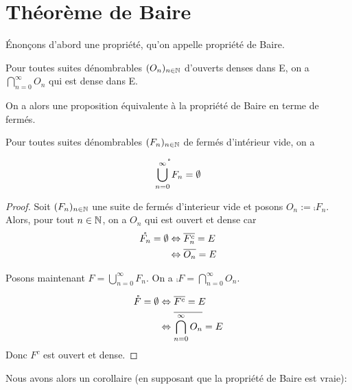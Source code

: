 \chapter{Théorème de Baire}
\label{chapter_baire_theorem}

Énonçons d'abord une propriété, qu'on appelle propriété de Baire.

\begin{propriete} 
	\label{property_baire_open}
	Pour toutes suites dénombrables $(O_{n})_{n \in \mathbb{N}}$ d'ouverts denses dans E, on a $\displaystyle
	\bigcap_{n = 0}^{\infty} O_{n}$ qui est dense dans E.
\end{propriete}

On a alors une proposition équivalente à la propriété de Baire en terme de
fermés.

\begin{propriete} 
\label{property_baire_closed}
Pour toutes suites dénombrables $(F_{n})_{n \in \mathbb{N}}$ de fermés d'intérieur vide, on a
	
	\begin{equation}
		\mathring{\bigcup_{n = 0}^{\infty} F_{n}} = \emptyset
	\end{equation}
\end{propriete}

\ifdefined\outputproof
\begin{proof}
	Soit $(F_{n})_{n \in \mathbb{N}}$ une suite de fermés d'interieur vide et
	posons $O_{n} := \comp{F_{n}}$. Alors, pour tout $n \in \mathbb{N}$, on a
	$O_{n}$ qui est ouvert et dense car
	\begin{align}
		\mathring{F_{n}} = \emptyset &\Leftrightarrow \overline{F_{n}^{c}} = E \\
		& \Leftrightarrow \overline{O_{n}} = E
	\end{align}

	Posons maintenant $F = \bigcup_{n = 0}^{\infty} F_{n}$. On a $\comp{F} = \bigcap_{n = 0}^{\infty} O_{n}$.

	\begin{align}
		\mathring{F} = \emptyset & \Leftrightarrow \overline{F^{c}} = E \\
		& \Leftrightarrow \overline{\bigcap_{n = 0}^{\infty} O_{n}} = E
	\end{align}
	Donc $F^{c}$ est ouvert et dense.
\end{proof}
\fi

Nous avons alors un corollaire (en supposant que la propriété de Baire est
vraie):

